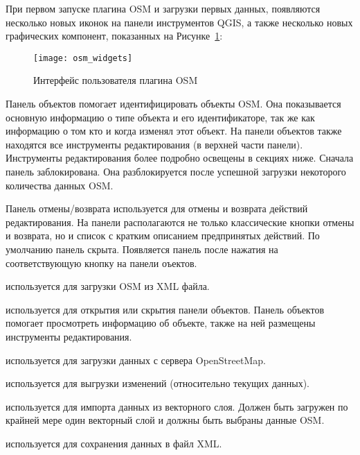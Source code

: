 При первом запуске плагина OSM и загрузки первых данных, появляются
несколько новых иконок на панели инструментов QGIS, а также несколько
новых графических компонент, показанных на Рисунке~\ref{fig:osmwidget}:

\begin{figure}[ht]
   \centering
   \texttt{[image: osm\_widgets]}
   \caption{Интерфейс пользователя плагина OSM \nixcaption}\label{fig:osmwidget}
\end{figure}


Панель объектов помогает идентифицировать объекты OSM. Она показывается
основную информацию о типе объекта и его идентификаторе, так же как
информацию о том кто и когда изменял этот объект. На панели объектов
также находятся все инструменты редактирования (в верхней части панели).
Инструменты редактирования более подробно освещены в секциях ниже.
Сначала панель заблокирована. Она разблокируется после успешной загрузки
некоторого количества данных OSM.


Панель отмены/возврата используется для отмены и возврата действий
редактирования. На панели располагаются не только классические кнопки
отмены и возврата, но и список с кратким описанием предпринятых действий.
По умолчанию панель скрыта. Появляется панель после нажатия на
соответствующую кнопку на панели оъектов.


\begin{description}
\item {} используется для
загрузки OSM из XML файла.
\item {}
используется для открытия или скрытия панели объектов. Панель объектов
помогает просмотреть информацию об объекте, также на ней размещены
инструменты редактирования.
\item {}
используется для загрузки данных с сервера OpenStreetMap.
\item {} используется для
выгрузки изменений (относительно текущих данных).
\item {}
используется для импорта данных из векторного слоя. Должен быть загружен
по крайней мере один векторный слой и должны быть выбраны данные OSM.
\item {} используется для
сохранения данных в файл XML.
\end{description}

